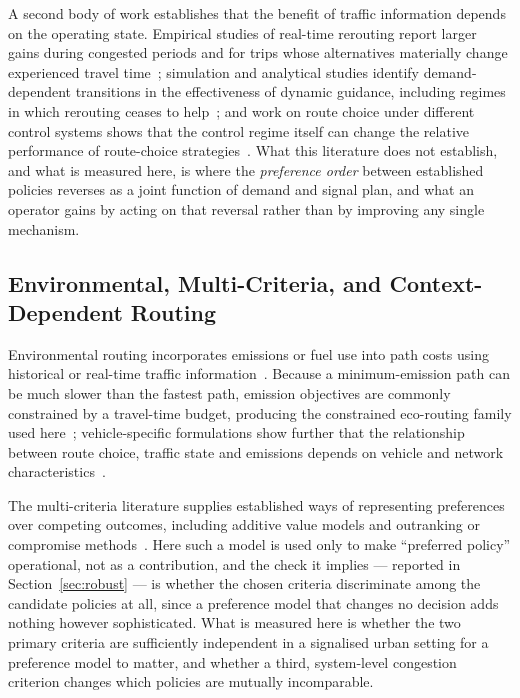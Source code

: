 \documentclass[runningheads]{llncs}
\begin{document}
A second body of work establishes that the benefit of traffic information depends on the
operating state. Empirical studies of real-time rerouting report larger gains during
congested periods and for trips whose alternatives materially change experienced travel
time~\cite{falek2021reroute}; simulation and analytical studies identify demand-dependent
transitions in the effectiveness of dynamic guidance, including regimes in which
rerouting ceases to help~\cite{novikov2018dynamic,routing2026phase,chen2025detour}; and
work on route choice under different control systems shows that the control regime itself
can change the relative performance of route-choice
strategies~\cite{xie2014unified,papageorgiou2003review}. What this literature does not
establish, and what is measured here, is where the \emph{preference order} between
established policies reverses as a joint function of demand and signal plan, and what an
operator gains by acting on that reversal rather than by improving any single mechanism.

\subsection{Environmental, Multi-Criteria, and Context-Dependent Routing}

Environmental routing incorporates emissions or fuel use into path costs using historical
or real-time traffic information~\cite{boriboonsomsin2012ecorouting,zeng2016prediction}.
Because a minimum-emission path can be much slower than the fastest path, emission
objectives are commonly constrained by a travel-time budget, producing the constrained
eco-routing family used here~\cite{zeng2017svm,huang2018ecorouting}; vehicle-specific
formulations show further that the relationship between route choice, traffic state and
emissions depends on vehicle and network characteristics~\cite{wang2019ecorouting}.

The multi-criteria literature supplies established ways of representing preferences over
competing outcomes, including additive value models and outranking or compromise
methods~\cite{keeney1993decisions,hwang1981multiple,opricovic2004compromise,%
brans1985preference,ehrgott2005multicriteria}. Here such a model is used only to make
``preferred policy'' operational, not as a contribution, and the check it implies ---
reported in Section~\ref{sec:robust} --- is whether the chosen criteria discriminate among
the candidate policies at all, since a preference model that changes no decision adds
nothing however sophisticated. What is measured here is whether the two primary criteria
are sufficiently independent in a signalised urban setting for a preference model to
matter, and whether a third, system-level congestion criterion changes which policies are
mutually incomparable.
\end{document}
